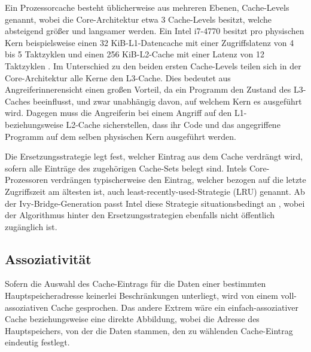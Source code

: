 Ein Prozessorcache besteht üblicherweise aus mehreren Ebenen, Cache-Levels genannt, wobei die Core-Architektur etwa 3 Cache-Levels besitzt, welche absteigend größer und langsamer werden. Ein Intel i7-4770 besitzt pro physischen Kern beispielsweise einen 32 KiB-L1-Datencache mit einer Zugriffslatenz von 4 bis 5 Taktzyklen und einen 256 KiB-L2-Cache mit einer Latenz von 12 Taktzyklen \cite{CacheStatsHaswell}.
Im Unterschied zu den beiden ersten Cache-Levels teilen sich in der Core-Architektur alle Kerne den L3-Cache. 
Dies bedeutet aus Angreiferinnerensicht einen großen Vorteil, da ein Programm  den Zustand des L3-Caches beeinflusst, und zwar unabhängig davon, auf welchem Kern es ausgeführt wird.
Dagegen muss die Angreiferin bei einem Angriff auf den L1- beziehungsweise L2-Cache sicherstellen, dass ihr Code und das angegriffene Programm auf dem selben physischen Kern ausgeführt werden.

Die Ersetzungsstrategie legt fest, welcher Eintrag aus dem Cache verdrängt wird, sofern alle Einträge des zugehörigen Cache-Sets belegt sind. 
Intels Core-Prozessoren verdrängen typischerweise den Eintrag, welcher bezogen auf die letzte Zugriffszeit am ältesten ist, auch least-recently-used-Strategie (LRU) genannt. 
Ab der Ivy-Bridge-Generation passt Intel diese Strategie situationsbedingt an \cite{CacheReplacementPolicy}, wobei der Algorithmus hinter den Ersetzungsstrategien ebenfalls nicht öffentlich zugänglich ist. 

\subsection{Assoziativität}

Sofern die Auswahl des Cache-Eintrags für die Daten einer bestimmten Hauptspeicheradresse keinerlei Beschränkungen unterliegt, wird von einem voll-assoziativen Cache gesprochen. 
Das andere Extrem wäre ein einfach-assoziativer Cache beziehungsweise eine direkte Abbildung, wobei die Adresse des Hauptspeichers, von der die Daten stammen, den zu wählenden Cache-Eintrag eindeutig festlegt. 

